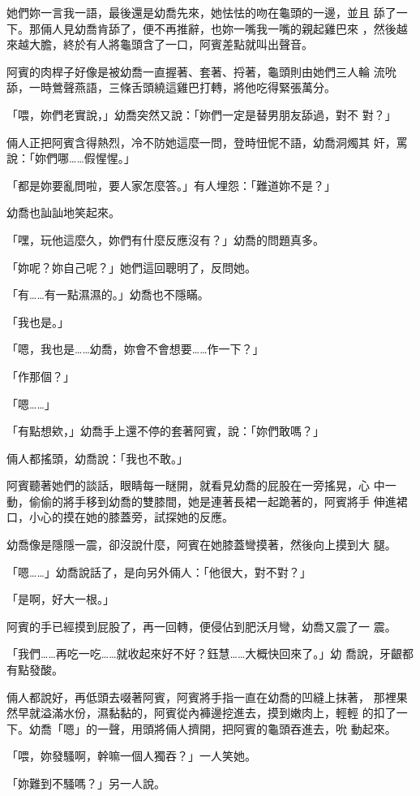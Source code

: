 她們妳一言我一語，最後還是幼喬先來，她怯怯的吻在龜頭的一邊，並且
舔了一下。那倆人見幼喬肯舔了，便不再推辭，也妳一嘴我一嘴的親起雞巴來
，然後越來越大膽，終於有人將龜頭含了一口，阿賓差點就叫出聲音。

阿賓的肉桿子好像是被幼喬一直握著、套著、捋著，龜頭則由她們三人輪
流吮舔，一時鶯聲燕語，三條舌頭繞這雞巴打轉，將他吃得緊張萬分。

「喂，妳們老實說，」幼喬突然又說：「妳們一定是替男朋友舔過，對不
對？」

倆人正把阿賓含得熱烈，冷不防她這麼一問，登時忸怩不語，幼喬洞燭其
奸，罵說：「妳們哪……假惺惺。」

「都是妳要亂問啦，要人家怎麼答。」有人埋怨：「難道妳不是？」

幼喬也訕訕地笑起來。

「嘿，玩他這麼久，妳們有什麼反應沒有？」幼喬的問題真多。

「妳呢？妳自己呢？」她們這回聰明了，反問她。

「有……有一點濕濕的。」幼喬也不隱瞞。

「我也是。」

「嗯，我也是……幼喬，妳會不會想要……作一下？」

「作那個？」

「嗯……」

「有點想欸，」幼喬手上還不停的套著阿賓，說：「妳們敢嗎？」

倆人都搖頭，幼喬說：「我也不敢。」

阿賓聽著她們的談話，眼睛每一瞇開，就看見幼喬的屁股在一旁搖晃，心
中一動，偷偷的將手移到幼喬的雙膝間，她是連著長裙一起跪著的，阿賓將手
伸進裙口，小心的摸在她的膝蓋旁，試探她的反應。

幼喬像是隱隱一震，卻沒說什麼，阿賓在她膝蓋彎摸著，然後向上摸到大
腿。

「嗯……」幼喬說話了，是向另外倆人：「他很大，對不對？」

「是啊，好大一根。」

阿賓的手已經摸到屁股了，再一回轉，便侵佔到肥沃月彎，幼喬又震了一
震。

「我們……再吃一吃……就收起來好不好？鈺慧……大概快回來了。」幼
喬說，牙齦都有點發酸。

倆人都說好，再低頭去啜著阿賓，阿賓將手指一直在幼喬的凹縫上抹著，
那裡果然早就溢滿水份，濕黏黏的，阿賓從內褲邊挖進去，摸到嫩肉上，輕輕
的扣了一下。幼喬「嗯」的一聲，用頭將倆人擠開，把阿賓的龜頭吞進去，吮
動起來。

「喂，妳發騷啊，幹嘛一個人獨吞？」一人笑她。

「妳難到不騷嗎？」另一人說。

